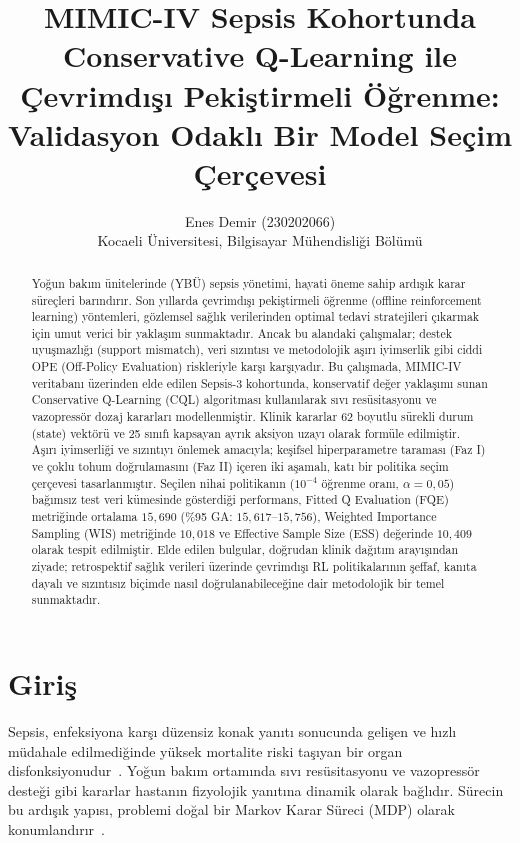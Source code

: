 \documentclass[11pt,a4paper]{article}
\title{MIMIC-IV Sepsis Kohortunda Conservative Q-Learning ile Çevrimdışı Pekiştirmeli Öğrenme:\\Validasyon Odaklı Bir Model Seçim Çerçevesi}
\author{Enes Demir (230202066)\\Kocaeli Üniversitesi, Bilgisayar Mühendisliği Bölümü}
\date{}
\begin{document}
\shorthandoff{=}
\maketitle

\begin{abstract}
Yoğun bakım ünitelerinde (YBÜ) sepsis yönetimi, hayati öneme sahip ardışık karar süreçleri barındırır. Son yıllarda çevrimdışı pekiştirmeli öğrenme (offline reinforcement learning) yöntemleri, gözlemsel sağlık verilerinden optimal tedavi stratejileri çıkarmak için umut verici bir yaklaşım sunmaktadır. Ancak bu alandaki çalışmalar; destek uyuşmazlığı (support mismatch), veri sızıntısı ve metodolojik aşırı iyimserlik gibi ciddi OPE (Off-Policy Evaluation) riskleriyle karşı karşıyadır. Bu çalışmada, MIMIC-IV veritabanı üzerinden elde edilen Sepsis-3 kohortunda, konservatif değer yaklaşımı sunan Conservative Q-Learning (CQL) algoritması kullanılarak sıvı resüsitasyonu ve vazopressör dozaj kararları modellenmiştir. Klinik kararlar 62 boyutlu sürekli durum (state) vektörü ve 25 sınıfı kapsayan ayrık aksiyon uzayı olarak formüle edilmiştir. Aşırı iyimserliği ve sızıntıyı önlemek amacıyla; keşifsel hiperparametre taraması (Faz I) ve çoklu tohum doğrulamasını (Faz II) içeren iki aşamalı, katı bir politika seçim çerçevesi tasarlanmıştır. Seçilen nihai politikanın ($10^{-4}$ öğrenme oranı, $\alpha=0{,}05$) bağımsız test veri kümesinde gösterdiği performans, Fitted Q Evaluation (FQE) metriğinde ortalama $15{,}690$ (\%95 GA: $15{,}617$--$15{,}756$), Weighted Importance Sampling (WIS) metriğinde $10{,}018$ ve Effective Sample Size (ESS) değerinde $10{,}409$ olarak tespit edilmiştir. Elde edilen bulgular, doğrudan klinik dağıtım arayışından ziyade; retrospektif sağlık verileri üzerinde çevrimdışı RL politikalarının şeffaf, kanıta dayalı ve sızıntısız biçimde nasıl doğrulanabileceğine dair metodolojik bir temel sunmaktadır.
\end{abstract}

\section{Giriş}
Sepsis, enfeksiyona karşı düzensiz konak yanıtı sonucunda gelişen ve hızlı müdahale edilmediğinde yüksek mortalite riski taşıyan bir organ disfonksiyonudur~\cite{singer2016sepsis3}. Yoğun bakım ortamında sıvı resüsitasyonu ve vazopressör desteği gibi kararlar hastanın fizyolojik yanıtına dinamik olarak bağlıdır. Sürecin bu ardışık yapısı, problemi doğal bir Markov Karar Süreci (MDP) olarak konumlandırır~\cite{evans2021surviving}.
\end{document}
